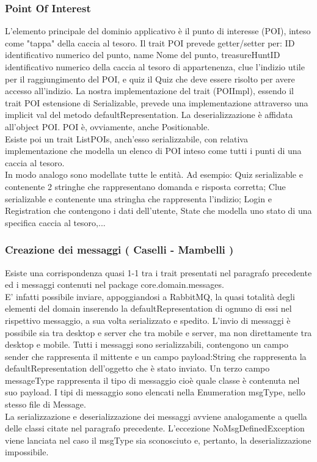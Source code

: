 \documentclass[12pt, italian]{article}
\begin{document}
\subsubsection*{Point Of Interest}
L'elemento principale del dominio applicativo è il punto di interesse (POI), inteso come "tappa" della caccia al tesoro.
Il trait POI prevede getter/setter per: ID identificativo numerico del punto, name Nome del punto, treasureHuntID identificativo numerico della caccia al tesoro di appartenenza, clue l'indizio utile per il raggiungimento del POI, e quiz il Quiz che deve essere risolto per avere accesso all'indizio.
La nostra implementazione del trait (POIImpl), essendo il trait POI estensione di Serializable, prevede una implementazione attraverso una implicit val del metodo defaultRepresentation. La deserializzazione è affidata all'object POI.
POI è, ovviamente, anche Positionable.\\
Esiste poi un trait ListPOIs, anch'esso serializzabile, con relativa implementazione che modella un elenco di POI inteso come tutti i punti di una caccia al tesoro.\\
In modo analogo sono modellate tutte le entità. Ad esempio: Quiz serializable e contenente 2 stringhe che rappresentano domanda e risposta corretta; Clue serializable e contenente una stringha che rappresenta l'indizio; Login e Registration che contengono i dati dell'utente, State che modella uno stato di una specifica caccia al tesoro,...

\subsubsection{Creazione dei messaggi ( Caselli - Mambelli )}
Esiste una corrispondenza quasi 1-1 tra i trait presentati nel paragrafo precedente ed i messaggi contenuti nel package core.domain.messages.\\
E' infatti possibile inviare, appoggiandosi a RabbitMQ, la quasi totalità degli elementi del domain inserendo la defaultRepresentation di ognuno di essi nel rispettivo messaggio, a sua volta serializzato e spedito.
L'invio di messaggi è possibile sia tra desktop e server che tra mobile e server, ma non direttamente tra desktop e mobile.
Tutti i messaggi sono serializzabili, contengono un campo sender che rappresenta il mittente e un campo payload:String che rappresenta la defaultRepresentation dell'oggetto che è stato inviato.
Un terzo campo messageType rappresenta il tipo di messaggio cioè quale classe è contenuta nel suo payload.
I tipi di messaggio sono elencati nella Enumeration msgType, nello stesso file di Message.\\
La serializzazione e deserializzazione dei messaggi avviene analogamente a quella delle classi citate nel paragrafo precedente.
L'eccezione NoMsgDefinedException viene lanciata nel caso il msgType sia sconosciuto e, pertanto, la deserializzazione impossibile.
\end{document}
